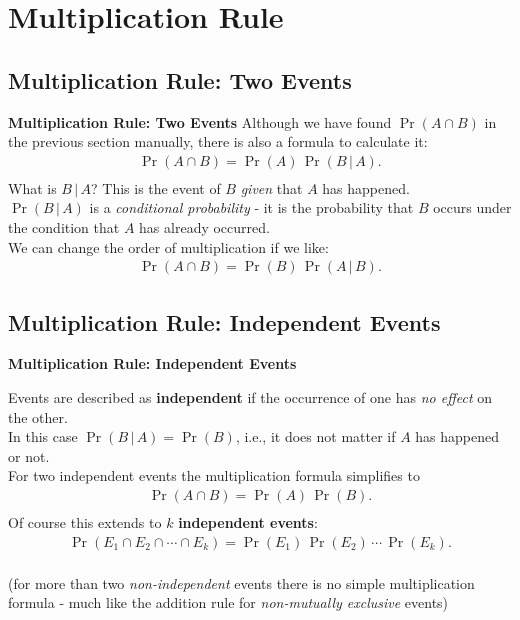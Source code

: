 \documentclass[compress]{beamer}        %
\makeatletter
\newcommand{\tcb}{\textcolor{beamer@blendedblue}}
\makeatother
\begin{document}
\section{Multiplication Rule}
\subsection{Multiplication Rule: Two Events}
\begin{frame}{\bf \tcb{Multiplication Rule: Two Events}}
Although we have found $\Pr(A \cap B)$ in the previous section manually, there is also a formula to calculate it:\\[-0.3cm]
\begin{align*}
\boxed{\Pr(A \cap B) = \Pr(A) \, \Pr(B\,|\,A)}.\\[-0.3cm]
\end{align*}
What is $B\,|\,A$? This is the event of $B$ \emph{given} that $A$ has happened.\\[0.3cm]
$\Pr(B\,|\,A)$ is a \emph{conditional probability} - it is the probability that $B$ occurs under the condition that $A$ has already occurred.\\[0.6cm]
We can change the order of multiplication if we like:
\begin{align*}
\Pr(A \cap B) = \Pr(B) \, \Pr(A\,|\,B).
\end{align*}
\end{frame}


\subsection{Multiplication Rule: Independent Events}
\begin{frame}{\bf \tcb{Multiplication Rule: Independent Events}}

Events are described as {\bf independent} if the occurrence of one has \emph{no effect} on the other.\\[0.2cm]
In this case $\boxed{\Pr(B\,|\,A) = \Pr(B)}$, i.e., it does not matter if $A$ has happened or not.\\[0.4cm]
For two independent events the multiplication formula simplifies to
\begin{align*}
\Pr(A \cap B) = \Pr(A) \, \Pr(B).\\[-0.3cm]
\end{align*}
Of course this extends to {\boldmath$k$} {\bf independent events}:
\begin{align*}
\boxed{\Pr(E_1 \cap E_2 \cap \cdots \cap E_k) = \Pr(E_1) \, \Pr(E_2) \,\cdots \, \Pr(E_k)}.\\
\end{align*}

{\footnotesize(for more than two \emph{non-independent} events there is no simple multiplication formula - much like the addition rule for \emph{non-mutually exclusive} events)}

\end{frame}
\end{document}
